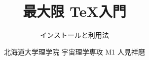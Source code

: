 
\newcommand{\centeralign}[1]{\rule{0pt}{0pt}\hfill#1\hfill\rule{0pt}{0pt}}
\newcommand{\typecommand}[1]{\colorbox{darkgray}{{\ttfamily\color{lime}#1}}}
\newcommand{\typecmdbox}[1]{
	\begin{tcolorbox}[
		sharp corners,left=0mm,right=0mm,top=0mm,bottom=0mm,
		colframe=darkgray,
		colback=darkgray,
	]
		{\ttfamily\color{lime}#1}
	\end{tcolorbox}
}

\setlength{\parskip}{2ex}

\title{最大限 \TeX 入門}
\subtitle{インストールと利用法}
\author{北海道大学理学院 宇宙理学専攻 M1 人見祥磨}
\date{\warekitoday}


\rubyusejghost %

\frame{\maketitle}


